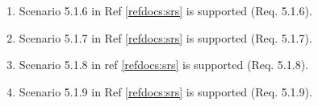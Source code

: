 \documentclass[a4paper]{article}
\newlength{\testlabellength}
\newenvironment{testlist}{\begin{enumerate}[label=\bfseries Instruction \thesubsection.\arabic* , labelindent=0pt, labelwidth=\testlabellength , leftmargin=2cm]}{\end{enumerate}}
\newenvironment{precondition}{
{\color{white}BLARG}\\ 
\textbf{Precondition}
\begin{itemize}[labelindent=0cm, labelwidth=2cm , leftmargin=1cm]
}
{\end{itemize}}
\newenvironment{instruction}{
\textbf{Instructions:}
\begin{enumerate}[label=\bfseries  \arabic*., labelindent=0cm, labelwidth=2cm , leftmargin=1cm]
}
{\end{enumerate}}
\newenvironment{postcondition}{
\textbf{Postcondition:}
\begin{itemize}[labelindent=0cm, labelwidth=2cm , leftmargin=1cm]
}
{\end{itemize}}
\begin{document}
\begin{appendices}
\begin{testlist}
	\item Scenario 5.1.6 in Ref \ref{refdocs:srs} is supported (Req. 5.1.6).

	\item Scenario 5.1.7 in Ref \ref{refdocs:srs} is supported (Req. 5.1.7).

	\item Scenario 5.1.8 in ref \ref{refdocs:srs} is supported (Req. 5.1.8).

	\item Scenario 5.1.9 in Ref \ref{refdocs:srs} is supported (Req. 5.1.9).


\end{testlist}
\end{appendices}
\end{document}
